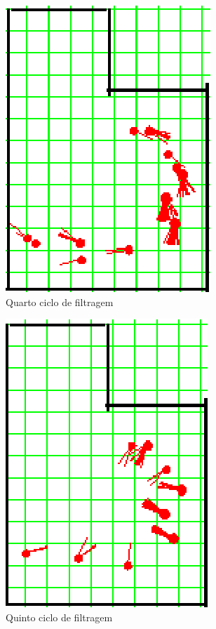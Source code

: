 \begin{figure}[H]
  \centering
  \includegraphics[scale=1]{figuras/cen2_ex3/5.eps}
  \caption[Quarto Ciclo de Filtragem]{Quarto ciclo de filtragem}
  \label{img:cen2_ex3_5}
\end{figure}

\begin{figure}[H]
  \centering
  \includegraphics[scale=1]{figuras/cen2_ex3/6.eps}
  \caption[Quinto Ciclo de Filtragem]{Quinto ciclo de filtragem}
  \label{img:cen2_ex3_6}
\end{figure}

